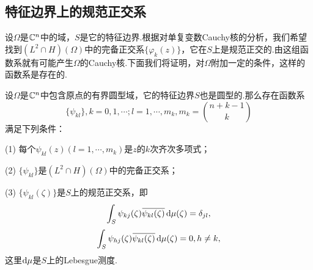 \subsection{特征边界上的规范正交系}
设$\Omega$是$\mathbb C^n$中的域，$S$是它的特征边界.根据对单复变数Cauchy核的分析，我们希望找到$(L^2\cap H)(\Omega)$中的完备正交系$\{\varphi_k(z)\}$，它在$S$上是规范正交的.由这组函数系就有可能产生$\Omega$的Cauchy核.下面我们将证明，对$\Omega$附加一定的条件，这样的函数系是存在的.
\begin{theorem}\label{thm4.2.2}
	设$\Omega$是$\mathbb C^n$中包含原点的有界圆型域，它的特征边界$S$也是圆型的.那么存在函数系
	\[\{\psi_{kl}\},k=0,1,\cdots;l=1,\cdots,m_k,m_k=\binom{n+k-1}{k}\]
	满足下列条件：
	
	(1)\hypertarget{4.2.2}{}
	每个$\psi_{kl}(z)(l=1,\cdots,m_k)$是$z$的$k$次齐次多项式；
	
	(2)\hypertarget{4.2.2}{}
	$\{\psi_{kl}\}$是$(L^2\cap H)(\Omega)$中的完备正交系；
	
	(3)\hypertarget{4.2.2}{}
	$\{\psi_{kl}(\zeta)\}$是$S$上的规范正交系，即
	\[\int_S \psi_{kj}(\zeta){}\mkern1mu\overline{\mkern-1mu\psi_{kl}(\zeta)}\mathop{}\!\mathrm{d}\mu(\zeta)=\delta_{jl},\]
	\[\int_S \psi_{hj}(\zeta){}\mkern1mu\overline{\mkern-1mu\psi_{kl}(\zeta)}\mathop{}\!\mathrm{d}\mu(\zeta)=0,h\neq k,\]
	这里$\mathop{}\!\mathrm{d}\mu$是$S$上的Lebesgue测度.
\end{theorem}
